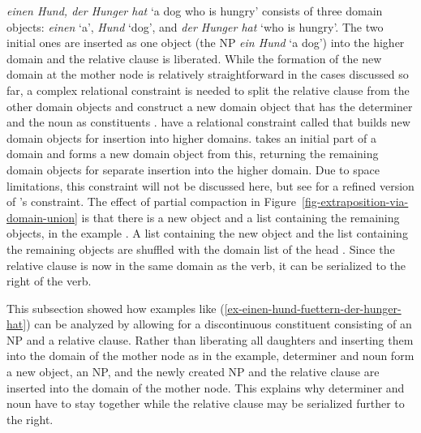 \documentclass[output=paper,biblatex,babelshorthands,newtxmath,draftmode,colorlinks,citecolor=brown]{langscibook}
\begin{document}
\emph{einen Hund, der Hunger hat} `a dog who is hungry' consists of three domain objects:
\emph{einen} `a', \emph{Hund} `dog', and \emph{der Hunger hat} `who is hungry'. The two initial ones
are inserted as one object (the NP \emph{ein Hund} `a dog') into the higher domain
and the relative clause is liberated. While the formation of the new domain at the mother node is
relatively straightforward in the cases discussed so far, a complex relational constraint is needed
to split the relative clause  from the other domain objects and construct a new domain
object that has the determiner and the noun as constituents . \citeauthor{KP95a} have a relational constraint called
 that builds new domain objects for insertion into higher
domains.  takes an initial part of a domain and forms a new domain object
from this, returning the remaining domain objects for separate insertion into the higher domain. Due
to space limitations, this constraint will not be discussed here, but see  for a refined version of \citeauthor{KP95a}'s constraint. The effect of partial
compaction in Figure~\ref{fig-extraposition-via-domain-union} is that there is a new object 
and a list containing the remaining objects, in the example . A list containing
the new object  and the list containing the remaining objects  are
shuffled with the domain list of the head . Since the relative clause is now in the same domain
as the verb, it can be serialized to the right of the verb.

This subsection showed how examples like (\ref{ex-einen-hund-fuettern-der-hunger-hat}) can be
analyzed by allowing for a discontinuous constituent consisting of an NP and a relative
clause. Rather than liberating all daughters and inserting them into the domain of the mother node
as in the  example, determiner and noun form a new object, an NP, and the newly created NP
and the relative clause are inserted into the domain of the mother node. This explains why
determiner and noun have to stay together while the relative clause may be serialized further to the right.%

\end{document}

